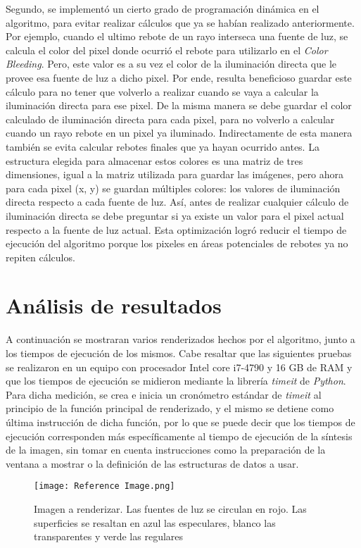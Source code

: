 \documentclass[conference]{IEEEtran}
\begin{document}
Segundo, se implementó un cierto grado de programación dinámica en el algoritmo, para evitar realizar cálculos que ya se habían realizado anteriormente. Por ejemplo, cuando el ultimo rebote de un rayo interseca una fuente de luz, se calcula el color del pixel donde ocurrió el rebote para utilizarlo en el \textit{Color Bleeding}. Pero, este valor es a su vez el color de la iluminación directa que le provee esa fuente de luz a dicho pixel. Por ende, resulta beneficioso guardar este cálculo para no tener que volverlo a realizar cuando se vaya a calcular la iluminación directa para ese pixel. De la misma manera se debe guardar el color calculado de iluminación directa para cada pixel, para no volverlo a calcular cuando un rayo rebote en un pixel ya iluminado. Indirectamente de esta manera también se evita calcular rebotes finales que ya hayan ocurrido antes. La estructura elegida para almacenar estos colores es una matriz de tres dimensiones, igual a la matriz utilizada para guardar las imágenes, pero ahora para cada pixel (x, y) se guardan múltiples colores: los valores de iluminación directa respecto a cada fuente de luz. Así, antes de realizar cualquier cálculo de iluminación directa se debe preguntar si ya existe un valor para el pixel actual respecto a la fuente de luz actual. Esta optimización logró reducir el tiempo de ejecución del algoritmo porque los pixeles en áreas potenciales de rebotes ya no repiten cálculos.

\section{Análisis de resultados}

A continuación se mostraran varios renderizados hechos por el algoritmo, junto a los tiempos de ejecución de los mismos. Cabe resaltar que las siguientes pruebas se realizaron en un equipo con procesador Intel core i7-4790 y 16 GB de RAM y que los tiempos de ejecución se midieron mediante la librería \textit{timeit} de \textit{Python}. Para dicha medición, se crea e inicia un cronómetro estándar de \textit{timeit} al principio de la función principal de renderizado, y el mismo se detiene como última instrucción de dicha función, por lo que se puede decir que los tiempos de ejecución corresponden más específicamente al tiempo de ejecución de la síntesis de la imagen, sin tomar en cuenta instrucciones como la preparación de la ventana a mostrar o la definición de las estructuras de datos a usar. 

\begin{figure}[htbp]
\centerline{\texttt{[image: Reference Image.png]}}
\caption{Imagen a renderizar. Las fuentes de luz se circulan en rojo. Las superficies se resaltan en azul las especulares, blanco las transparentes y verde las regulares}
\label{Imagen de referencia}
\end{figure}
\end{document}
